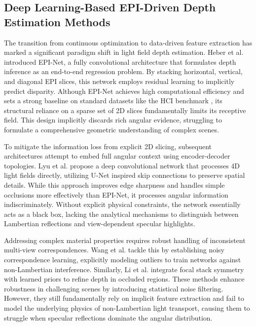 \documentclass[lettersize,journal]{IEEEtran}
\begin{document}
\subsection{Deep Learning-Based EPI-Driven Depth Estimation Methods}

The transition from continuous optimization to data-driven feature extraction has marked a significant paradigm shift in light field depth estimation. Heber et al. \cite{heber2018} introduced EPI-Net, a fully convolutional architecture that formulates depth inference as an end-to-end regression problem. By stacking horizontal, vertical, and diagonal EPI slices, this network employs residual learning \cite{he2016} to implicitly predict disparity. Although EPI-Net achieves high computational efficiency and sets a strong baseline on standard datasets like the HCI benchmark \cite{honauer2016}, its structural reliance on a sparse set of 2D slices fundamentally limits its receptive field. This design implicitly discards rich angular evidence, struggling to formulate a comprehensive geometric understanding of complex scenes.

To mitigate the information loss from explicit 2D slicing, subsequent architectures attempt to embed full angular context using encoder-decoder topologies. Lyu et al. \cite{lyu2022} propose a deep convolutional network that processes 4D light fields directly, utilizing U-Net \cite{ronneberger2015} inspired skip connections to preserve spatial details. While this approach improves edge sharpness and handles simple occlusions more effectively than EPI-Net, it processes angular information indiscriminately. Without explicit physical constraints, the network essentially acts as a black box, lacking the analytical mechanisms to distinguish between Lambertian reflections and view-dependent specular highlights. 

Addressing complex material properties requires robust handling of inconsistent multi-view correspondences. Wang et al. \cite{wang2023} tackle this by establishing noisy correspondence learning, explicitly modeling outliers to train networks against non-Lambertian interference. Similarly, Li et al. \cite{li2020} integrate focal stack symmetry with learned priors to refine depth in occluded regions. These methods enhance robustness in challenging scenes by introducing statistical noise filtering. However, they still fundamentally rely on implicit feature extraction and fail to model the underlying physics of non-Lambertian light transport, causing them to struggle when specular reflections dominate the angular distribution.
\end{document}
